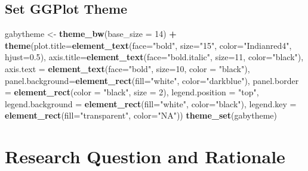 \documentclass[12pt,]{article}
\newenvironment{Shaded}{\begin{snugshade}}{\end{snugshade}}
\newcommand{\KeywordTok}[1]{\textcolor[rgb]{0.13,0.29,0.53}{\textbf{#1}}}
\newcommand{\DataTypeTok}[1]{\textcolor[rgb]{0.13,0.29,0.53}{#1}}
\newcommand{\DecValTok}[1]{\textcolor[rgb]{0.00,0.00,0.81}{#1}}
\newcommand{\FloatTok}[1]{\textcolor[rgb]{0.00,0.00,0.81}{#1}}
\newcommand{\StringTok}[1]{\textcolor[rgb]{0.31,0.60,0.02}{#1}}
\newcommand{\OperatorTok}[1]{\textcolor[rgb]{0.81,0.36,0.00}{\textbf{#1}}}
\newcommand{\NormalTok}[1]{#1}
\begin{document}
\subsection{Set GGPlot Theme}\label{set-ggplot-theme}

\begin{Shaded}
\begin{Highlighting}[]
\NormalTok{gabytheme <-}\StringTok{ }\KeywordTok{theme_bw}\NormalTok{(}\DataTypeTok{base_size =} \DecValTok{14}\NormalTok{) }\OperatorTok{+}\StringTok{ }
\StringTok{  }\KeywordTok{theme}\NormalTok{(}\DataTypeTok{plot.title=}\KeywordTok{element_text}\NormalTok{(}\DataTypeTok{face=}\StringTok{"bold"}\NormalTok{, }\DataTypeTok{size=}\StringTok{"15"}\NormalTok{, }\DataTypeTok{color=}\StringTok{"Indianred4"}\NormalTok{, }\DataTypeTok{hjust=}\FloatTok{0.5}\NormalTok{),}
        \DataTypeTok{axis.title=}\KeywordTok{element_text}\NormalTok{(}\DataTypeTok{face=}\StringTok{"bold.italic"}\NormalTok{, }\DataTypeTok{size=}\DecValTok{11}\NormalTok{, }\DataTypeTok{color=}\StringTok{"black"}\NormalTok{),}
\DataTypeTok{axis.text =} \KeywordTok{element_text}\NormalTok{(}\DataTypeTok{face=}\StringTok{"bold"}\NormalTok{, }\DataTypeTok{size=}\DecValTok{10}\NormalTok{, }\DataTypeTok{color =} \StringTok{"black"}\NormalTok{), }
\DataTypeTok{panel.background=}\KeywordTok{element_rect}\NormalTok{(}\DataTypeTok{fill=}\StringTok{"white"}\NormalTok{, }\DataTypeTok{color=}\StringTok{"darkblue"}\NormalTok{), }
\DataTypeTok{panel.border =} \KeywordTok{element_rect}\NormalTok{(}\DataTypeTok{color =} \StringTok{"black"}\NormalTok{, }\DataTypeTok{size =} \DecValTok{2}\NormalTok{),}
\DataTypeTok{legend.position =} \StringTok{"top"}\NormalTok{, }\DataTypeTok{legend.background =} \KeywordTok{element_rect}\NormalTok{(}\DataTypeTok{fill=}\StringTok{"white"}\NormalTok{, }\DataTypeTok{color=}\StringTok{"black"}\NormalTok{),}
            \DataTypeTok{legend.key =} \KeywordTok{element_rect}\NormalTok{(}\DataTypeTok{fill=}\StringTok{"transparent"}\NormalTok{, }\DataTypeTok{color=}\StringTok{"NA"}\NormalTok{))}
\KeywordTok{theme_set}\NormalTok{(gabytheme)}
\end{Highlighting}
\end{Shaded}

\section{Research Question and
Rationale}\label{research-question-and-rationale-1}
\end{document}
